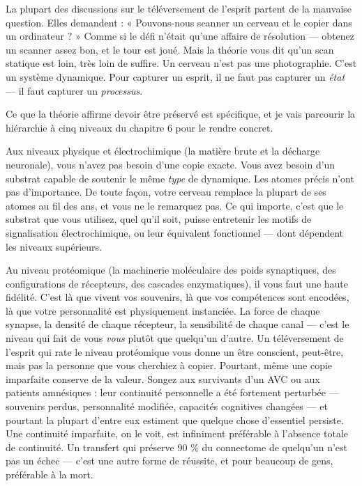 \documentclass[11pt, twoside, openright]{book}
\begin{document}
La plupart des discussions sur le téléversement de l'esprit partent de la mauvaise question. Elles demandent : « Pouvons-nous scanner un cerveau et le copier dans un ordinateur ? » Comme si le défi n'était qu'une affaire de résolution --- obtenez un scanner assez bon, et le tour est joué. Mais la théorie vous dit qu'un scan statique est loin, très loin de suffire. Un cerveau n'est pas une photographie. C'est un système dynamique. Pour capturer un esprit, il ne faut pas capturer un \textit{état} --- il faut capturer un \textit{processus}.

Ce que la théorie affirme devoir être préservé est spécifique, et je vais parcourir la hiérarchie à cinq niveaux du chapitre 6 pour le rendre concret.

Aux niveaux physique et électrochimique (la matière brute et la décharge neuronale), vous n'avez pas besoin d'une copie exacte. Vous avez besoin d'un substrat capable de soutenir le même \textit{type} de dynamique. Les atomes précis n'ont pas d'importance. De toute façon, votre cerveau remplace la plupart de ses atomes au fil des ans, et vous ne le remarquez pas. Ce qui importe, c'est que le substrat que vous utilisez, quel qu'il soit, puisse entretenir les motifs de signalisation électrochimique, ou leur équivalent fonctionnel --- dont dépendent les niveaux supérieurs.

Au niveau protéomique (la machinerie moléculaire des poids synaptiques, des configurations de récepteurs, des cascades enzymatiques), il vous faut une haute fidélité. C'est là que vivent vos souvenirs, là que vos compétences sont encodées, là que votre personnalité est physiquement instanciée. La force de chaque synapse, la densité de chaque récepteur, la sensibilité de chaque canal --- c'est le niveau qui fait de vous \textit{vous} plutôt que quelqu'un d'autre. Un téléversement de l'esprit qui rate le niveau protéomique vous donne un être conscient, peut-être, mais pas la personne que vous cherchiez à copier. Pourtant, même une copie imparfaite conserve de la valeur. Songez aux survivants d'un AVC ou aux patients amnésiques : leur continuité personnelle a été fortement perturbée --- souvenirs perdus, personnalité modifiée, capacités cognitives changées --- et pourtant la plupart d'entre eux estiment que quelque chose d'essentiel persiste. Une continuité imparfaite, on le voit, est infiniment préférable à l'absence totale de continuité. Un transfert qui préserve 90 \% du connectome de quelqu'un n'est pas un échec --- c'est une autre forme de réussite, et pour beaucoup de gens, préférable à la mort.
\end{document}
